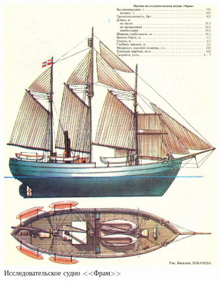 \begin{figure}
    \centering
    \includegraphics[width=1\textwidth]{Figs/FRAM.jpg}
    \caption{Исследовательское судно <<Фрам>>}
    \label{fig:fram}
\end{figure}

